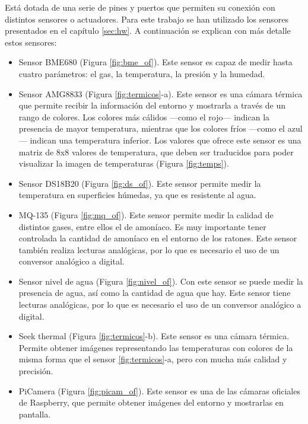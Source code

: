 Está dotada de una serie de pines y puertos que permiten su conexión con distintos sensores o actuadores. Para este trabajo se han utilizado los sensores presentados en el capítulo \ref{sec:hw}. A continuación se explican con más detalle estos sensores:
\begin{itemize}
\item{Sensor BME680 (Figura \ref{fig:bme_of}).} Este sensor es capaz de medir hasta cuatro parámetros: el gas, la temperatura, la presión y la humedad.

\item{Sensor AMG8833 (Figura \ref{fig:termicos}-a).} Este sensor es una cámara térmica que permite recibir la información del entorno y mostrarla a través de un rango de colores. Los colores más cálidos ---como el rojo--- indican la presencia de mayor temperatura, mientras que los colores fríos ---como el azul--- indican una temperatura inferior. Los valores que ofrece este sensor es una matriz de 8x8 valores de temperatura, que deben ser traducidos para poder visualizar la imagen de temperaturas (Figura \ref{fig:temps}).

\item{Sensor DS18B20 (Figura \ref{fig:ds_of}).} Este sensor permite medir la temperatura en superficies húmedas, ya que es resistente al agua.

\item{MQ-135 (Figura \ref{fig:mq_of}).} Este sensor permite medir la calidad de distintos gases, entre ellos el de amoníaco. Es muy importante tener controlada la cantidad de amoníaco en el entorno de los ratones. Este sensor también realiza lecturas analógicas, por lo que es necesario el uso de un conversor analógico a digital.

\item{Sensor nivel de agua (Figura \ref{fig:nivel_of}).} Con este sensor se puede medir la presencia de agua, así como la cantidad de agua que hay. Este sensor tiene lecturas analógicas, por lo que es necesario el uso de un conversor analógico a digital.

\item{Seek thermal (Figura \ref{fig:termicos}-b).} Este sensor es una cámara térmica. Permite obtener imágenes representando las temperaturas con colores de la misma forma que el sensor \ref{fig:termicos}-a, pero con mucha más calidad y precisión.

\item{PiCamera (Figura \ref{fig:picam_of}).} Este sensor es una de las cámaras oficiales de Raspberry, que permite obtener imágenes del entorno y mostrarlas en pantalla.
\end{itemize}


